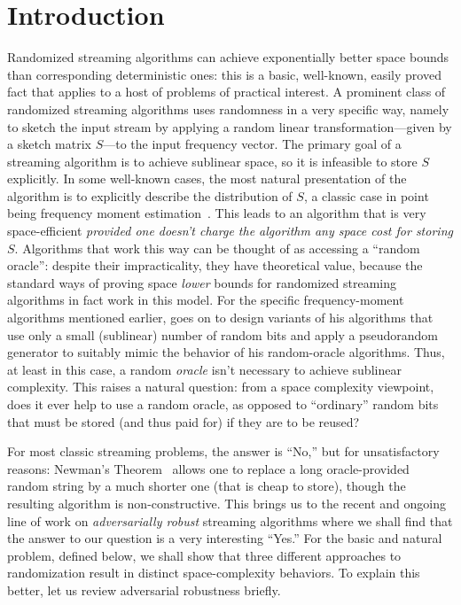 \section{Introduction}\label{sec:intro}

Randomized streaming algorithms can achieve exponentially better space bounds
than corresponding deterministic ones: this is a basic, well-known, easily
proved fact that applies to a host of problems of practical interest. A
prominent class of randomized streaming algorithms uses randomness in a very
specific way, namely to sketch the input stream by applying a random linear
transformation---given by a sketch matrix $S$---to the input frequency vector.
The primary goal of a streaming algorithm is to achieve sublinear space, so it
is infeasible to store $S$ explicitly. In some well-known cases, the most
natural presentation of the algorithm is to explicitly describe the
distribution of $S$, a classic case in point being frequency moment
estimation~\cite{Indyk06}. This leads to an algorithm that is very
space-efficient {\em provided one doesn't charge the algorithm any space cost
for storing $S$}. Algorithms that work this way can be thought of as accessing
a ``random oracle'': despite their impracticality, %
they have theoretical
value, because the standard ways of proving space {\em lower} bounds for
randomized streaming algorithms in fact work in this model. For the specific
frequency-moment algorithms mentioned earlier, \cite{Indyk06} goes on to
design variants of his algorithms that use only a small (sublinear) number of
random bits and apply a pseudorandom generator to suitably mimic the behavior
of his random-oracle algorithms. Thus, at least in this case, a random {\em
oracle} isn't necessary to achieve sublinear complexity. This raises a natural
question: from a space complexity viewpoint, does it ever help to use a random
oracle, as opposed to ``ordinary'' random bits that must be stored (and thus
paid for) if they are to be reused?

For most classic streaming problems, the answer is ``No,'' but for
unsatisfactory reasons: Newman's Theorem~\cite{Newman91} allows one to replace
a long oracle-provided random string by a much shorter one (that is cheap to
store), though the resulting algorithm is non-constructive. This brings us to
the recent and ongoing line of work on {\em adversarially robust} streaming
algorithms where we shall find that the answer to our question is a very
interesting ``Yes.'' For the basic and natural \miflong problem, defined
below, we shall show that three different approaches to randomization result
in distinct space-complexity behaviors. To explain this better, let us review
adversarial robustness briefly.

